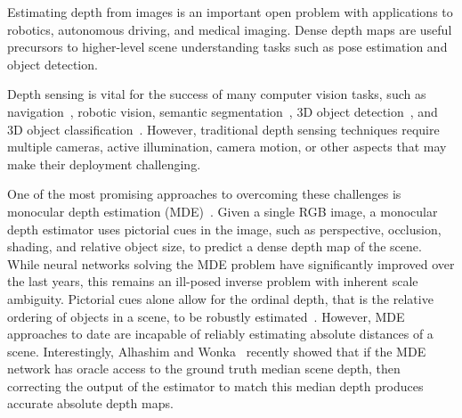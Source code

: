 Estimating depth from images is an important open problem with applications to robotics, autonomous driving, and medical imaging. Dense depth maps are useful precursors to higher-level scene understanding tasks such as pose estimation and object detection.

Depth sensing is vital for the success of many computer vision tasks, such as navigation~\cite{geiger2013vision}, robotic vision, semantic segmentation~\cite{ren2012rgb,silberman2012indoor,gupta2013perceptual}, 3D object detection~\cite{shrivastava2013building,lin2013holistic,gupta2014learning,song2014sliding,song2016deep}, and 3D object classification~\cite{wu20153d,maturana2015voxnet,qi2016volumetric}. However, traditional depth sensing techniques require multiple cameras, active illumination, camera motion, or other aspects that may make their deployment challenging.

One of the most promising approaches to overcoming these challenges is monocular depth estimation (MDE)~\cite{Saxena2006,Eigen2014,Laina2016,Fu2018,Alhashim2018}. Given a single RGB image, a monocular depth estimator uses pictorial cues in the image, such as perspective, occlusion, shading, and relative object size, to predict a dense depth map of the scene. While neural networks solving the MDE problem have significantly improved over the last years, this remains an ill-posed inverse problem with inherent scale ambiguity. Pictorial cues alone allow for the ordinal depth, that is the relative ordering of objects in a scene, to be robustly estimated~\cite{Eigen2014,Fu2018}. However, MDE approaches to date are incapable of reliably estimating absolute distances of a scene. Interestingly, Alhashim and Wonka~\cite{Alhashim2018} recently showed that if the MDE network has oracle access to the ground truth median scene depth, then correcting the output of the estimator to match this median depth produces accurate absolute depth maps.



